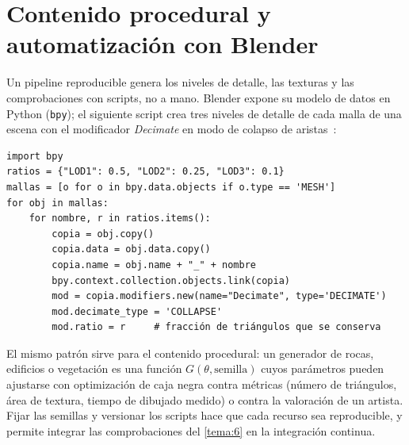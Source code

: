 \section{Contenido procedural y automatización con Blender}

Un pipeline reproducible genera los niveles de detalle, las texturas y las comprobaciones con scripts, no a mano. Blender expone su modelo de datos en Python (\texttt{bpy}); el siguiente script crea tres niveles de detalle de cada malla de una escena con el modificador \emph{Decimate} en modo de colapso de aristas~\cite{blenderapi}:

\begin{center}
\begin{minipage}{0.92\textwidth}
\small
\begin{verbatim}
import bpy
ratios = {"LOD1": 0.5, "LOD2": 0.25, "LOD3": 0.1}
mallas = [o for o in bpy.data.objects if o.type == 'MESH']
for obj in mallas:
    for nombre, r in ratios.items():
        copia = obj.copy()
        copia.data = obj.data.copy()
        copia.name = obj.name + "_" + nombre
        bpy.context.collection.objects.link(copia)
        mod = copia.modifiers.new(name="Decimate", type='DECIMATE')
        mod.decimate_type = 'COLLAPSE'
        mod.ratio = r     # fracción de triángulos que se conserva
\end{verbatim}
\end{minipage}
\end{center}

El mismo patrón sirve para el contenido procedural: un generador de rocas, edificios o vegetación es una función $G(\theta,\text{semilla})$ cuyos parámetros pueden ajustarse con optimización de caja negra contra métricas (número de triángulos, área de textura, tiempo de dibujado medido) o contra la valoración de un artista. Fijar las semillas y versionar los scripts hace que cada recurso sea reproducible, y permite integrar las comprobaciones del \cref{tema:6} en la integración continua.

